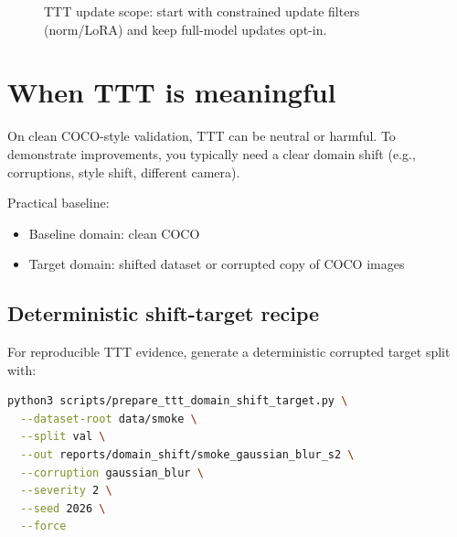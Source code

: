 \begin{figure}[h]
\centering
{}
\caption{TTT update scope: start with constrained update filters (norm/LoRA) and keep full-model updates opt-in.}
\end{figure}

\section{When TTT is meaningful}
On clean COCO-style validation, TTT can be neutral or harmful.
To demonstrate improvements, you typically need a clear domain shift (e.g., corruptions, style shift, different camera).

Practical baseline:
\begin{itemize}
  \item Baseline domain: clean COCO 
  \item Target domain: shifted dataset or corrupted copy of COCO images
\end{itemize}

\subsection{Deterministic shift-target recipe}
For reproducible TTT evidence, generate a deterministic corrupted target split with:
\begin{lstlisting}[language=bash]
python3 scripts/prepare_ttt_domain_shift_target.py \
  --dataset-root data/smoke \
  --split val \
  --out reports/domain_shift/smoke_gaussian_blur_s2 \
  --corruption gaussian_blur \
  --severity 2 \
  --seed 2026 \
  --force
\end{lstlisting}

